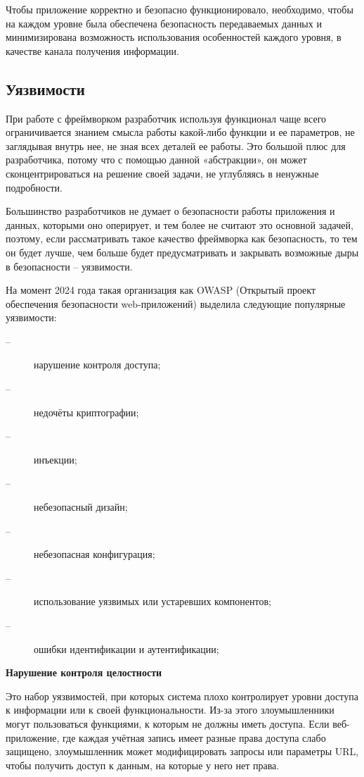 Чтобы приложение корректно и безопасно функционировало, необходимо, чтобы на каждом уровне
была обеспечена безопасность передаваемых данных и минимизирована возможность использования особенностей каждого уровня,
в качестве канала получения информации.


\newpage
\subsection{Уязвимости}
При работе с фреймворком разработчик используя функционал чаще всего
ограничивается знанием смысла работы какой-либо функции и ее параметров, не заглядывая внутрь 
нее, не зная всех деталей ее работы. Это большой плюс для разработчика, потому что с помощью
данной «абстракции», он может сконцентрироваться на решение своей задачи, не углубляясь
в ненужные подробности.

Большинство разработчиков не думает о безопасности работы приложения и данных, которыми 
оно оперирует, и тем более не считают это основной задачей, поэтому, если рассматривать
такое качество фреймворка как безопасность, то тем он будет лучше, чем больше будет 
предусматривать и закрывать возможные дыры в безопасности -- уязвимости.

На момент 2024 года такая организация как OWASP (Открытый проект обеспечения безопасности web-приложений) выделила следующие 
популярные уязвимости:
\begin{description}
  \item[--] нарушение контроля доступа;
  \item[--] недочёты криптографии;
  \item[--] инъекции;
  \item[--] небезопасный дизайн;
  \item[--] небезопасная конфигурация;
  \item[--] использование уязвимых или устаревших компонентов;
  \item[--] ошибки идентификации и аутентификации;
\end{description}

\textbf{Нарушение контроля целостности}

Это набор уязвимостей, при которых система плохо контролирует уровни доступа к информации или к своей функциональности.
Из-за этого злоумышленники могут пользоваться функциями, к которым не должны иметь доступа.
Если  веб-приложение, где каждая учётная запись имеет разные права доступа слабо защищено, злоумышленник
может модифицировать запросы или параметры URL, чтобы получить доступ к данным, на которые у него нет права.

